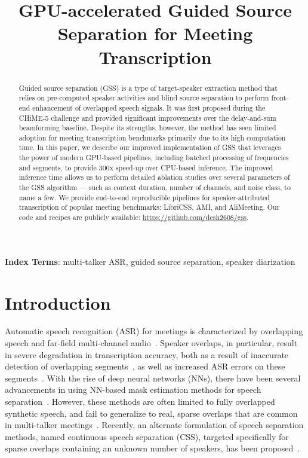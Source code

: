 \documentclass[a4paper]{article}
\title{GPU-accelerated Guided Source Separation for Meeting Transcription}
\begin{document}
\maketitle
\begin{abstract}
Guided source separation (GSS) is a type of target-speaker extraction method that relies on pre-computed speaker activities and blind source separation to perform front-end enhancement of overlapped speech signals.
It was first proposed during the CHiME-5 challenge and provided significant improvements over the delay-and-sum beamforming baseline.
Despite its strengths, however, the method has seen limited adoption for meeting transcription benchmarks primarily due to its high computation time.
In this paper, we describe our improved implementation of GSS that leverages the power of modern GPU-based pipelines, including batched processing of frequencies and segments, to provide 300x speed-up over CPU-based inference.
The improved inference time allows us to perform detailed ablation studies over several parameters of the GSS algorithm --- such as context duration, number of channels, and noise class, to name a few.
We provide end-to-end reproducible pipelines for speaker-attributed transcription of popular meeting benchmarks: LibriCSS, AMI, and AliMeeting.
Our code and recipes are publicly available: \url{https://github.com/desh2608/gss}.
\end{abstract}
\noindent\textbf{Index Terms}: multi-talker ASR, guided source separation, speaker diarization

\section{Introduction}

Automatic speech recognition (ASR) for meetings is characterized by overlapping speech and far-field multi-channel audio~\cite{Raj2021IntegrationOS}. Speaker overlaps, in particular, result in severe degradation in transcription accuracy, both as a result of inaccurate detection of overlapping segments~\cite{Boakye2008OverlappedSD,Bullock2020OverlapawareDR}, as well as increased ASR errors on these segments~\cite{Kanda2020SerializedOT,Chen2017TheAO,Yu2020AudiovisualMR}. With the rise of deep neural networks (NNs), there have been several advancements in using NN-based mask estimation methods for speech separation~\cite{Luo2020DualPathRE,Luo2019ConvTasNetSI,Subakan2021AttentionIA}. However, these methods are often limited to fully overlapped synthetic speech, and fail to generalize to real, sparse overlaps that are common in multi-talker meetings~\cite{Cosentino2020LibriMixAO,Zeghidour2021WavesplitES,Menne2019AnalysisOD}. Recently, an alternate formulation of speech separation methods, named continuous speech separation (CSS), targeted specifically for sparse overlaps containing an unknown number of speakers, has been proposed~\cite{Chen2020ContinuousSS,Chen2021ContinuousSS}. 
\end{document}
